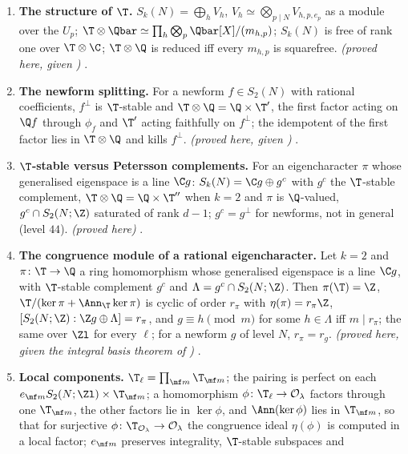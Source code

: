 \begin{enumerate}[label=\textbf{\thechapter.\arabic*}]
\emph{(proved here, given )} , .
\item \textbf{The structure of $\T$.} $S_k(N)=\bigoplus_hV_h$, $V_h\simeq\bigotimes_{p\mid N}V_{h,p,e_p}$ as a module over the $U_p$; $\T\otimes\Qbar\simeq\prod_h\bigotimes_p\Qbar[X]/(m_{h,p})$; $S_k(N)$ is
free of rank one over $\T\otimes\C$; $\T\otimes\Q$ is reduced iff every $m_{h,p}$ is squarefree. \emph{(proved here, given )} .
\item \textbf{The newform splitting.} For a newform $f\in S_2(N)$ with rational coefficients, $f^\perp$ is $\T$-stable and $\T\otimes\Q=\Q\times\T'$, the first factor acting on $\Q f$
through $\phi_f$ and $\T'$ acting faithfully on $f^\perp$; the idempotent of the first factor lies in $\T\otimes\Q$ and kills $f^\perp$. \emph{(proved here, given
)} .
\item \textbf{$\T$-stable versus Petersson complements.} For an eigencharacter $\pi$ whose generalised eigenspace is a line $\C g$: $S_k(N)=\C g\oplus g^c$ with $g^c$ the $\T$-stable
complement, $\T\otimes\Q=\Q\times\T''$ when $k=2$ and $\pi$ is $\Q$-valued, $g^c\cap S_2(N;\Z)$ saturated of rank $d-1$; $g^c=g^\perp$ for newforms, not in general (level $44$).
\emph{(proved here)} .
\item \textbf{The congruence module of a rational eigencharacter.} Let $k=2$ and $\pi\colon\T\to\Q$ a ring homomorphism whose generalised eigenspace is a line $\C g$, with $\T$-stable
complement $g^c$ and $\Lambda=g^c\cap S_2(N;\Z)$. Then $\pi(\T)=\Z$, $\T/(\ker\pi+\Ann_\T\ker\pi)$ is cyclic of order $r_\pi$ with $\eta(\pi)=r_\pi\Z$, $[S_2(N;\Z):\Z g\oplus\Lambda]=r_\pi$, and
$g\equiv h\pmod m$ for some $h\in\Lambda$ iff $m\mid r_\pi$; the same over $\Zl$ for every $\ell$; for a newform $g$ of level $N$, $r_\pi=r_g$. \emph{(proved here, given the integral basis
theorem of )} .
\item \textbf{Local components.} $\T_\ell=\prod_{\mf m}\T_{\mf m}$; the pairing is perfect on each $e_{\mf m}S_2(N;\Zl)\times\T_{\mf m}$; a homomorphism $\phi\colon\T_\ell\to\mathcal O_\lambda$ factors
through one $\T_{\mf m}$, the other factors lie in $\ker\phi$, and $\Ann(\ker\phi)$ lies in $\T_{\mf m}$, so that for surjective $\phi\colon\T_{\mathcal O_\lambda}\to\mathcal O_\lambda$ the congruence ideal $\eta(\phi)$ is computed in a local factor; $e_{\mf m}$ preserves integrality, $\T$-stable subspaces and

\end{enumerate}
